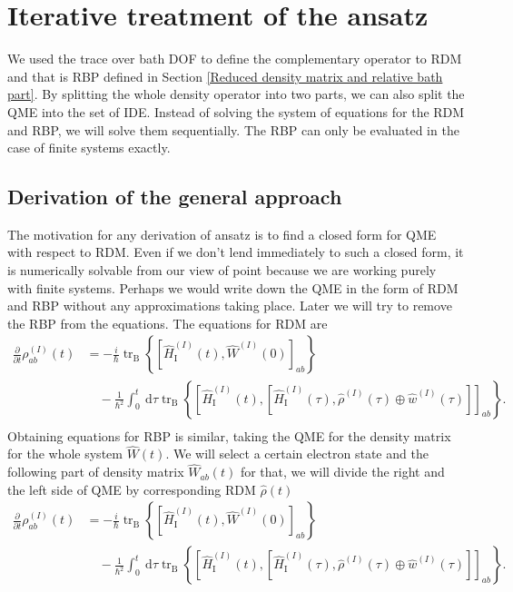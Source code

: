 \section{Iterative treatment of the ansatz}
\label{Iterative treatment of ansatz}

We used the trace over bath DOF to define the complementary operator to RDM and that is RBP defined in Section \ref{Reduced density matrix and relative bath part}. By splitting the whole density operator into two parts, we can also split the QME into the set of IDE. Instead of solving the system of equations for the RDM and RBP, we will solve them sequentially. The RBP can only be evaluated in the case of finite systems exactly.

\subsection{Derivation of the general approach}
The motivation for any derivation of ansatz is to find a closed form for QME with respect to RDM. Even if we don't lend immediately to such a closed form, it is numerically solvable from our view of point because we are working purely with finite systems. Perhaps we would write down the QME in the form of RDM and RBP without any approximations taking place. Later we will try to remove the RBP from the equations. The equations for RDM are
\begin{equation}
\label{QME_RDM}
    \begin{aligned}
    \frac{\partial}{\partial t} \rho^{(I)}_{ab}(t)
    &=-\frac{i}{\hbar}\operatorname{tr}_{\mathrm{B}}\left\{\left[\hat{H}_{\mathrm{I}}^{(I)}(t), \hat{W}^{(I)}(0)\right]_{ab}\right\} \\
    &\quad-\frac{1}{\hbar^{2}} \int_{0}^{t} \mathrm{~d} \tau\operatorname{tr}_{\mathrm{B}}\left\{\left[\hat{H}_{\mathrm{I}}^{(I)}(t),\left[\hat{H}_{\mathrm{I}}^{(I)}(\tau), \hat{\rho}^{(I)}(\tau) \oplus \hat{w}^{(I)}(\tau)\right]\right]_{ab}\right\}. \\
    \end{aligned}
\end{equation}
Obtaining equations for RBP is similar, taking the QME for the density matrix for the whole system $\hat{W}(t)$. We will select a certain electron state and the following part of density matrix $\hat{W}_{ab}(t)$ for that, we will divide the right and the left side of QME by corresponding RDM $\hat{\rho}(t)$
\begin{equation}
    \begin{aligned}
    \frac{\partial}{\partial t} \rho^{(I)}_{ab}(t)
    &=-\frac{i}{\hbar}\operatorname{tr}_{\mathrm{B}}\left\{\left[\hat{H}_{\mathrm{I}}^{(I)}(t), \hat{W}^{(I)}(0)\right]_{ab}\right\} \\
    &\quad-\frac{1}{\hbar^{2}} \int_{0}^{t} \mathrm{~d} \tau\operatorname{tr}_{\mathrm{B}}\left\{\left[\hat{H}_{\mathrm{I}}^{(I)}(t),\left[\hat{H}_{\mathrm{I}}^{(I)}(\tau), \hat{\rho}^{(I)}(\tau) \oplus \hat{w}^{(I)}(\tau)\right]\right]_{ab}\right\}. \\
    \end{aligned}
\end{equation}

